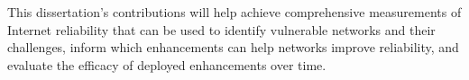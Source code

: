 This dissertation's contributions will help achieve comprehensive measurements of Internet reliability that can be used to identify vulnerable networks and their challenges, inform which enhancements can help networks improve reliability, and evaluate the efficacy of deployed enhancements over time.

